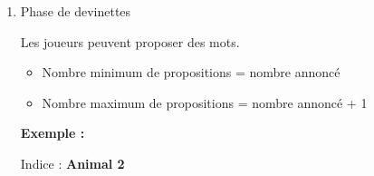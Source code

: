 \documentclass[12pt,a4paper]{article}
\begin{document}
\begin{enumerate}
\begin{enumerate}
                            \begin{tcolorbox}
                            Indice : \textbf{Animal 2}
                            \end{tcolorbox}

                            Cela signifie que 2 mots sur la table sont liés à "animal".

                            \vspace{0.5cm}
                            
                            \textbf{Règles strictes pour les indices}

                            \begin{itemize}
                                \item Un seul mot (pas de phrase)
                                \item Pas un mot présent sur la table
                                \item Pas une partie d’un mot (ex : "auto" pour "automobile" interdit)
                                \item Pas de traduction directe (ex : dire "dog" pour "chien")
                                \item Pas de communication non verbale
                            \end{itemize}

                        \vspace{0.5cm}
                        
                        \item Phase de devinettes

                            Les joueurs peuvent proposer des mots.

                            \begin{itemize}
                                \item Nombre minimum de propositions = nombre annoncé
                                \item Nombre maximum de propositions = nombre annoncé + 1
                            \end{itemize}

                            \vspace{0.5cm}

                            \textbf{Exemple :}

                            \begin{tcolorbox}
                            Indice : \textbf{Animal 2}
                            \end{tcolorbox}


\end{enumerate}
\end{enumerate}
\end{document}

